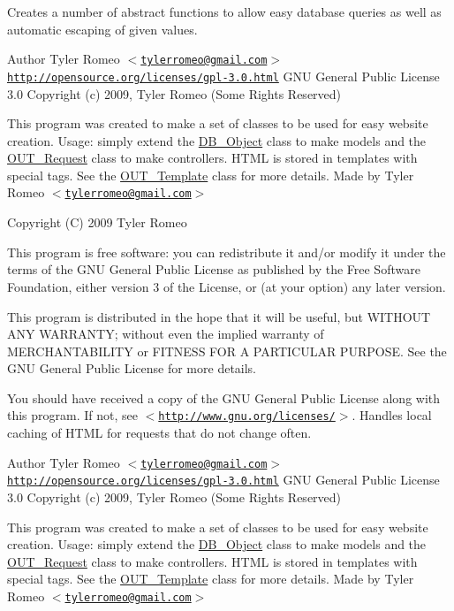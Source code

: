 Creates a number of abstract functions to allow easy database queries as well as automatic escaping of given values.

\begin{DoxyAuthor}{Author}
Tyler Romeo $<$\href{mailto:tylerromeo@gmail.com}{\tt tylerromeo@gmail.com}$>$  \href{http://opensource.org/licenses/gpl-3.0.html}{\tt http://opensource.org/licenses/gpl-\/3.0.html} GNU General Public License 3.0  Copyright (c) 2009, Tyler Romeo (Some Rights Reserved)
\end{DoxyAuthor}
This program was created to make a set of classes to be used for easy website creation. Usage: simply extend the \hyperlink{classDB__Object}{DB\_\-Object} class to make models and the \hyperlink{classOUT__Request}{OUT\_\-Request} class to make controllers. HTML is stored in templates with special tags. See the \hyperlink{classOUT__Template}{OUT\_\-Template} class for more details. Made by Tyler Romeo $<$\href{mailto:tylerromeo@gmail.com}{\tt tylerromeo@gmail.com}$>$

Copyright (C) 2009 Tyler Romeo

This program is free software: you can redistribute it and/or modify it under the terms of the GNU General Public License as published by the Free Software Foundation, either version 3 of the License, or (at your option) any later version.

This program is distributed in the hope that it will be useful, but WITHOUT ANY WARRANTY; without even the implied warranty of MERCHANTABILITY or FITNESS FOR A PARTICULAR PURPOSE. See the GNU General Public License for more details.

You should have received a copy of the GNU General Public License along with this program. If not, see $<$\href{http://www.gnu.org/licenses/}{\tt http://www.gnu.org/licenses/}$>$. Handles local caching of HTML for requests that do not change often.

\begin{DoxyAuthor}{Author}
Tyler Romeo $<$\href{mailto:tylerromeo@gmail.com}{\tt tylerromeo@gmail.com}$>$  \href{http://opensource.org/licenses/gpl-3.0.html}{\tt http://opensource.org/licenses/gpl-\/3.0.html} GNU General Public License 3.0  Copyright (c) 2009, Tyler Romeo (Some Rights Reserved)
\end{DoxyAuthor}
This program was created to make a set of classes to be used for easy website creation. Usage: simply extend the \hyperlink{classDB__Object}{DB\_\-Object} class to make models and the \hyperlink{classOUT__Request}{OUT\_\-Request} class to make controllers. HTML is stored in templates with special tags. See the \hyperlink{classOUT__Template}{OUT\_\-Template} class for more details. Made by Tyler Romeo $<$\href{mailto:tylerromeo@gmail.com}{\tt tylerromeo@gmail.com}$>$

